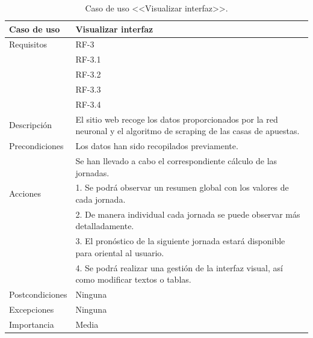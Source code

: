 \begin{table}
  \begin{center}
   \begin{tabular}{|p{3cm} | p{9cm} |}
    \hline
    Caso de uso & Visualizar interfaz\\
    \hline
    Requisitos & RF-3\\
	    & RF-3.1\\
	    & RF-3.2\\
    	& RF-3.3\\
    	& RF-3.4\\
    \hline
    Descripción & El sitio web recoge los datos proporcionados por la red neuronal y el algoritmo de scraping de las casas de apuestas.\\
    \hline
    Precondiciones &Los datos han sido recopilados previamente.\\
    &Se han llevado a cabo el correspondiente cálculo de las jornadas.\\
    \hline
    Acciones & 1. Se podrá observar un resumen global con los valores de cada jornada. \\
    &2. De manera individual cada jornada se puede observar más detalladamente.\\
    &3. El pronóstico de la siguiente jornada estará disponible para oriental al usuario.\\
    &4. Se podrá realizar una gestión de la interfaz visual, así como modificar textos o tablas.\\
    \hline
    Postcondiciones & Ninguna \\
    \hline
    Excepciones & Ninguna\\
    \hline
    Importancia & Media \\
    \hline
   \end{tabular}
   \caption{Caso de uso <<Visualizar interfaz>>.}
   \label{tabla:casoUso3}
  \end{center}
 \end{table} 
 
